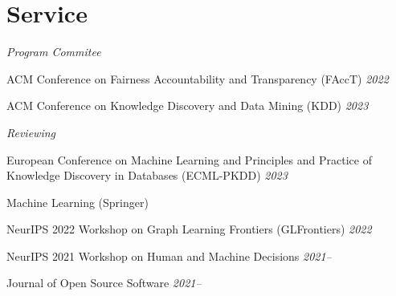 \documentclass[margin]{res}
\begin{document}
\begin{resume}
\begin{compactitem}
\end{compactitem}


\section{Service} 
%
%

\begin{compactitem}
	\item \emph{Program Commitee}
	\begin{compactitem}
		\item ACM Conference on Fairness Accountability and Transparency (FAccT) \hfill \emph{2022}
		\item ACM Conference on Knowledge Discovery and Data Mining (KDD) \hfill \emph{2023}
	\end{compactitem}
	\item \emph{Reviewing}
	\begin{compactitem}
		\item  European Conference on Machine Learning and Principles and Practice of Knowledge Discovery in Databases (ECML-PKDD) \hfill \emph{2023}
		\item Machine Learning (Springer)
		\item NeurIPS 2022 Workshop on Graph Learning Frontiers (GLFrontiers) \hfill \emph{2022}
		\item NeurIPS 2021 Workshop on Human and Machine Decisions \hfill \emph{2021--} 
		\item Journal of Open Source Software \hfill \emph{2021--}
	\end{compactitem}
	

\end{compactitem}
\end{resume}
\end{document}
